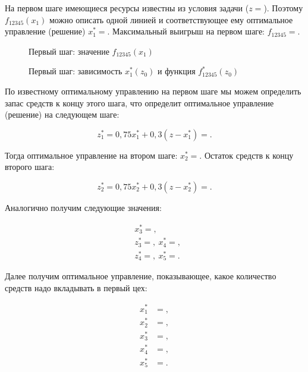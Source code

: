 На первом шаге имеющиеся ресурсы известны из условия задачи ($z =$). Поэтому $f_{12345}(x_1)$ можно описать одной линией и соответствующее ему оптимальное управление (решение) $x^*_1 = $. Максимальный выигрыш на первом шаге: $f_{12345} = $.

\begin{figure}[h!]
  \caption{Первый шаг: значение $f_{12345}(x_1)$\label{figure:family_1}}
\end{figure}

\begin{figure}[h!]
  \caption{Первый шаг: зависимость  $x^*_1(z_0)$ и функция $ f^*_{12345}(z_0) $\label{figure:opts_1}}
\end{figure}

\newpage

По известному оптимальному управлению на первом шаге мы можем определить запас средств к концу этого шага, что определит оптимальное управление (решение) на следующем шаге:

\begin{equation}
  z^*_1 = 0,75 x^*_1 + 0,3 (z - x^*_1) = .
\end{equation} 

Тогда оптимальное управление на втором шаге: $x^*_2 = $. Остаток средств к концу второго шага:

\begin{equation}
  z^*_2 = 0,75 x^*_2 + 0,3 (z - x^*_2) = .
\end{equation}

Аналогично получим следующие значения:

\begin{equation}
  \begin{aligned}
    &x^*_3 = , \\
    &z^*_3 = ,
    ~x^*_4 = , \\
    &z^*_4 = ,
    ~x^*_5 = .
  \end{aligned}
\end{equation}

Далее получим оптимальное управление, показывающее, какое количество средств надо вкладывать в первый цех:

\begin{equation}
  \begin{aligned}
    x^*_1 &= , \\
    x^*_2 &= , \\
    x^*_3 &= , \\
    x^*_4 &= , \\
    x^*_5 &= .
  \end{aligned}
\end{equation}

